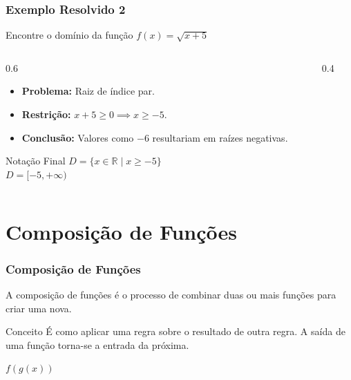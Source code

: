 \documentclass[9pt]{beamer}
\begin{document}
\begin{frame}
\frametitle{Exemplo Resolvido 2}
Encontre o domínio da função $f(x) = \sqrt{x + 5}$

\begin{columns}
\begin{column}{0.6\textwidth}
\begin{itemize}
    \item \textbf{Problema:} Raiz de índice par.
    \item \textbf{Restrição:} $x + 5 \ge 0 \implies x \ge -5$.
    \item \textbf{Conclusão:} Valores como $-6$ resultariam em raízes negativas.
\end{itemize}

\begin{block}{Notação Final}
$D = \{x \in \mathbb{R} \mid x \ge -5\}$ \\
$D = [-5, +\infty)$
\end{block}
\end{column}

\begin{column}{0.4\textwidth}
\centering
{}
\end{column}
\end{columns}
\end{frame}

\section{Composição de Funções}

\begin{frame}
\frametitle{Composição de Funções}
A composição de funções é o processo de combinar duas ou mais funções para criar uma nova.

\begin{block}{Conceito}
É como aplicar uma regra sobre o resultado de outra regra. A saída de uma função torna-se a entrada da próxima.
\end{block}

\centering
\Large $f(g(x))$
\end{frame}
\end{document}
